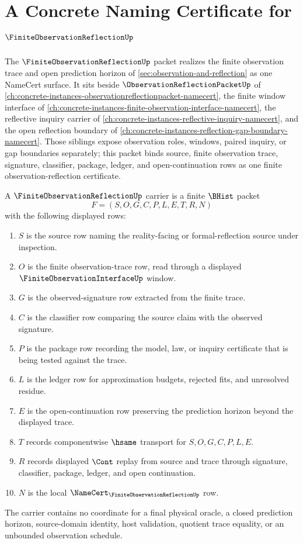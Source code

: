 \chapter{A Concrete Naming Certificate for $\FiniteObservationReflectionUp$}
\label{ch:concrete-instances-finite-observation-reflection-namecert}

The $\FiniteObservationReflectionUp$ packet realizes the finite observation trace and open prediction horizon of \autoref{sec:observation-and-reflection} as one NameCert surface. It sits beside $\ObservationReflectionPacketUp$ of \autoref{ch:concrete-instances-observationreflectionpacket-namecert}, the finite window interface of \autoref{ch:concrete-instances-finite-observation-interface-namecert}, the reflective inquiry carrier of \autoref{ch:concrete-instances-reflective-inquiry-namecert}, and the open reflection boundary of \autoref{ch:concrete-instances-reflection-gap-boundary-namecert}. Those siblings expose observation roles, windows, paired inquiry, or gap boundaries separately; this packet binds source, finite observation trace, signature, classifier, package, ledger, and open-continuation rows as one finite observation-reflection certificate.

\begin{definition}
\label{def:finite-observation-reflection-carrier}
A $\FiniteObservationReflectionUp$ carrier is a finite $\BHist$ packet
$$
F=(S,O,G,C,P,L,E,T,R,N)
$$
with the following displayed rows:
\begin{enumerate}
\item $S$ is the source row naming the reality-facing or formal-reflection source under inspection.
\item $O$ is the finite observation-trace row, read through a displayed $\FiniteObservationInterfaceUp$ window.
\item $G$ is the observed-signature row extracted from the finite trace.
\item $C$ is the classifier row comparing the source claim with the observed signature.
\item $P$ is the package row recording the model, law, or inquiry certificate that is being tested against the trace.
\item $L$ is the ledger row for approximation budgets, rejected fits, and unresolved residue.
\item $E$ is the open-continuation row preserving the prediction horizon beyond the displayed trace.
\item $T$ records componentwise $\hsame$ transport for $S,O,G,C,P,L,E$.
\item $R$ records displayed $\Cont$ replay from source and trace through signature, classifier, package, ledger, and open continuation.
\item $N$ is the local $\NameCert_{\FiniteObservationReflectionUp}$ row.
\end{enumerate}
The carrier contains no coordinate for a final physical oracle, a closed prediction horizon, source-domain identity, host validation, quotient trace equality, or an unbounded observation schedule.
\end{definition}

